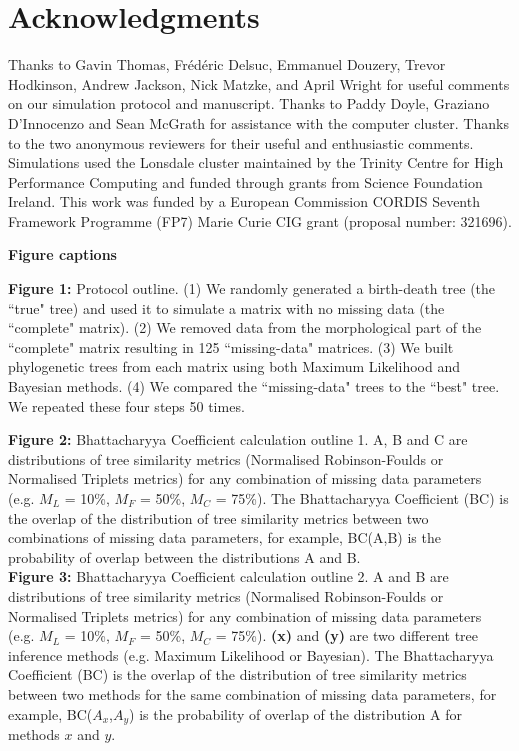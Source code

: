 \documentclass[12pt,letterpaper]{article}
\begin{document}
\section{Acknowledgments}
Thanks to Gavin Thomas, Fr\'{e}d\'{e}ric Delsuc, Emmanuel Douzery, Trevor Hodkinson, Andrew Jackson, Nick Matzke, and April Wright for useful comments on our simulation protocol and manuscript. Thanks to Paddy Doyle, Graziano D'Innocenzo and Sean McGrath for assistance with the computer cluster. Thanks to the two anonymous reviewers for their useful and enthusiastic %
comments. Simulations used the Lonsdale cluster maintained by the Trinity Centre for High Performance Computing and funded through grants from Science Foundation Ireland. This work was funded by a European Commission CORDIS Seventh Framework Programme (FP7) Marie Curie CIG grant (proposal number: 321696).

\nolinenumbers




\newpage
\noindent
\textbf{Figure captions}\\
\bigskip

\noindent
\textbf{Figure 1:} Protocol outline.
(1) We randomly generated a birth-death tree (the ``true" tree) and used it to simulate a matrix with no missing data (the ``complete" matrix).
(2) We removed data from the morphological part of the ``complete" matrix resulting in 125 ``missing-data" matrices.
(3) We built phylogenetic trees from each matrix using both Maximum Likelihood and Bayesian methods.
(4) We compared the ``missing-data" trees to the ``best" tree.
We repeated these four steps 50 times.\\
\bigskip

\noindent
\textbf{Figure 2:} Bhattacharyya Coefficient calculation outline 1. A, B and C are distributions of tree similarity metrics (Normalised Robinson-Foulds or Normalised Triplets metrics) for any combination of missing data parameters (e.g. $M_{L}$ = 10\%, $M_{F}$ = 50\%, $M_{C}$ = 75\%). The Bhattacharyya Coefficient (BC) is the overlap of the distribution of tree similarity metrics between two combinations of missing data parameters, for example, BC(A,B) is the probability of overlap between the distributions A and B.\\

\noindent
\textbf{Figure 3:} Bhattacharyya Coefficient calculation outline 2. A and B are distributions of tree similarity metrics (Normalised Robinson-Foulds or Normalised Triplets metrics) for any combination of missing data parameters (e.g. $M_{L}$ = 10\%, $M_{F}$ = 50\%, $M_{C}$ = 75\%). \textbf{(x)} and \textbf{(y)} are two different tree inference methods (e.g. Maximum Likelihood or Bayesian). The Bhattacharyya Coefficient (BC) is the overlap of the distribution of tree similarity metrics between two methods for the same combination of missing data parameters, for example, BC($A_{x}$,$A_{y}$) is the probability of overlap of the distribution A for methods $x$ and $y$.\\
\end{document}
